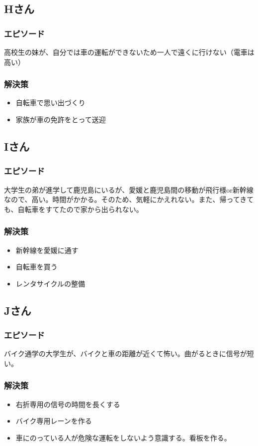 \documentclass[a4paper,12pt, uplatex]{jsbook}
\begin{document}
\subsection{Hさん}
\subsubsection{エピソード}
高校生の妹が、自分では車の運転ができないため一人で遠くに行けない（電車は高い）

\subsubsection{解決策}
\begin{itemize}
  \item 自転車で思い出づくり
  \item 家族が車の免許をとって送迎
\end{itemize}


\subsection{Iさん}
\subsubsection{エピソード}
大学生の弟が進学して鹿児島にいるが、愛媛と鹿児島間の移動が飛行様or新幹線なので、高い。時間がかかる。そのため、気軽にかえれない。また、帰ってきても、自転車をすてたので家から出られない。

\subsubsection{解決策}
\begin{itemize}
  \item 新幹線を愛媛に通す
  \item 自転車を買う
  \item レンタサイクルの整備
\end{itemize}


\subsection{Jさん}
\subsubsection{エピソード}
バイク通学の大学生が、バイクと車の距離が近くて怖い。曲がるときに信号が短い。

\subsubsection{解決策}
\begin{itemize}
  \item 右折専用の信号の時間を長くする
  \item バイク専用レーンを作る
  \item 車にのっている人が危険な運転をしないよう意識する。看板を作る。
\end{itemize}
\end{document}
